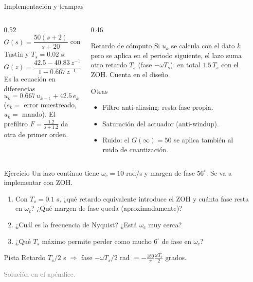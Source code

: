 \documentclass[aspectratio=169,11pt]{beamer}
\begin{document}
\begin{frame}{Implementación y trampas}
  \footnotesize
  \begin{columns}[T]
  \begin{column}{0.52\textwidth}
    $G(s)=\dfrac{50(s+2)}{s+20}$ con Tustin y $T_s=0.02$ s:
    \[ G(z)=\frac{42.5-40.83\,z^{-1}}{1-0.667\,z^{-1}} \]
    Es la ecuación en diferencias
    \[ u_k=0.667\,u_{k-1}+42.5\,e_k-40.83\,e_{k-1} \]
    ($e_k=$ error muestreado, $u_k=$ mando). El prefiltro $F=\frac{1.2}{s+1.2}$ da otra de primer orden.
  \end{column}
  \begin{column}{0.46\textwidth}
    \begin{alertblock}{Retardo de cómputo}
      Si $u_k$ se calcula con el dato $k$ pero se aplica en el periodo siguiente, el lazo suma otro retardo $T_s$ (fase $-\omega T_s$): en total $1.5\,T_s$ con el ZOH. Cuenta en el diseño.
    \end{alertblock}
    \begin{block}{Otras}
      \begin{itemize}
        \item Filtro anti-aliasing: resta fase propia.
        \item Saturación del actuador (anti-windup).
        \item Ruido: el $G(\infty)=50$ se aplica también al ruido de cuantización.
      \end{itemize}
    \end{block}
  \end{column}
  \end{columns}
\end{frame}

\begin{frame}{Ejercicio}
  \small
  Un lazo continuo tiene $\omega_c=10$ rad/s y margen de fase $56^\circ$. Se va a implementar con ZOH.
  \begin{enumerate}
    \item Con $T_s=0.1$ s, ¿qué retardo equivalente introduce el ZOH y cuánta fase resta en $\omega_c$? ¿Qué margen de fase queda (aproximadamente)?
    \item ¿Cuál es la frecuencia de Nyquist? ¿Está $\omega_c$ muy cerca?
    \item ¿Qué $T_s$ máximo permite perder como mucho $6^\circ$ de fase en $\omega_c$?
  \end{enumerate}
  \begin{block}{Pista}
    Retardo $T_s/2$ s $\Rightarrow$ fase $-\omega T_s/2$ rad $=-\frac{180}{\pi}\frac{\omega T_s}{2}$ grados.
  \end{block}
  \textcolor{gray}{Solución en el apéndice.}
\end{frame}
\end{document}
